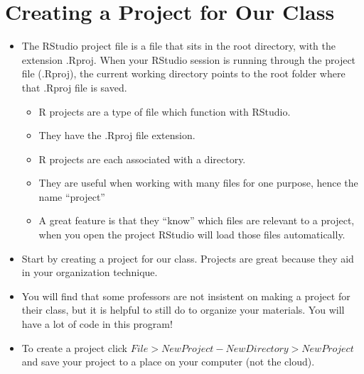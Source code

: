 \documentclass[
  letterpaper,
  DIV=11,
  numbers=noendperiod]{scrreprt}
\providecommand{\tightlist}{%
  \setlength{\itemsep}{0pt}\setlength{\parskip}{0pt}}\usepackage{longtable,booktabs,array}
\begin{document}

\chapter{Creating a Project for Our
Class}\label{creating-a-project-for-our-class-1}

\begin{itemize}
\tightlist
\item
  The RStudio project file is a file that sits in the root directory,
  with the extension .Rproj. When your RStudio session is running
  through the project file (.Rproj), the current working directory
  points to the root folder where that .Rproj file is saved.

  \begin{itemize}
  \tightlist
  \item
    R projects are a type of file which function with RStudio.
  \item
    They have the .Rproj file extension.
  \item
    R projects are each associated with a directory.
  \item
    They are useful when working with many files for one purpose, hence
    the name ``project''
  \item
    A great feature is that they ``know'' which files are relevant to a
    project, when you open the project RStudio will load those files
    automatically.
  \end{itemize}
\item
  Start by creating a project for our class. Projects are great because
  they aid in your organization technique.
\item
  You will find that some professors are not insistent on making a
  project for their class, but it is helpful to still do to organize
  your materials. You will have a lot of code in this program!
\item
  To create a project click
  \(File > New Project - New Directory > New Project\) and save your
  project to a place on your computer (not the cloud).
\end{itemize}
\end{document}
